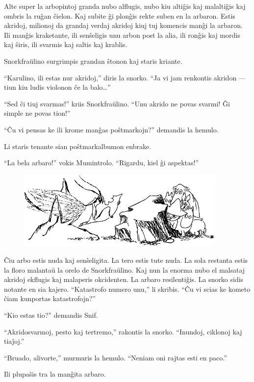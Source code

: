 Alte super la arbopintoj granda nubo alflugis, nubo kiu altiĝis kaj malaltiĝis kaj ombris la ruĝan ĉielon. Kaj subite ĝi plonĝis rekte suben en la arbaron. Estis akridoj, milionoj da grandaj verdaj akridoj kiuj tuj komencis manĝi la arbaron. Ili manĝis kraketante, ili senŝeligis unu arbon post la alia, ili ronĝis kaj mordis kaj ŝiris, ili svarmis kaj saltis kaj krablis.

Snorkfraŭlino surgrimpis grandan ŝtonon kaj staris kriante.

``Karulino, ili estas nur akridoj,'' diris la snorko. ``Ja vi jam renkontis akridon --- tiun kiu ludis violonon ĉe la balo{\ldots}''

``Sed ĉi tiuj svarmas!'' kriis Snorkfraŭlino. ``Unu akrido ne povas svarmi! Ĝi simple ne povas tion!''

``Ĉu vi pensas ke ili krome manĝas poŝtmarkojn?'' demandis la hemulo.

Li staris tenante sian poŝtmarkalbumon enbrake.

``La bela arbaro!'' vokis Mumintrolo. ``Rigardu, kiel ĝi aspektas!''

\begin{figure}[htbp]
\centering
\includegraphics[width=293pt,height=110pt]{8-5.png}
\caption{}
\label{8-5}
\end{figure}

Ĉiu arbo estis nuda kaj senŝeligita. La tero estis tute nuda. La sola restanta estis la floro malantaŭ la orelo de Snorkfraŭlino. Kaj nun la enorma nubo el malsataj akridoj ekflugis kaj malaperis okcidenten. La arbaro resilentiĝis. La snorko sidis notante en sia kajero. ``Katastrofo numero unu,'' li skribis. ``Ĉu vi scias ke kometo ĉiam kunportas katastrofojn?''

``Kio estas tio?'' demandis Snif.

``Akridosvarmoj, pesto kaj tertremo,'' rakontis la snorko. ``Inundoj, ciklonoj kaj tiaĵoj.''

``Bruado, alivorte,'' murmuris la hemulo. ``Neniam oni rajtas esti en paco.''

Ili plupaŝis tra la manĝita arbaro.

